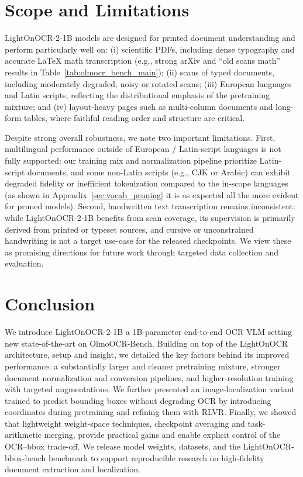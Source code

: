 \documentclass{article}
\begin{document}
\section{Scope and Limitations}
\label{sec:scope_limitations}

LightOnOCR-2-1B models are designed for printed document understanding and perform particularly well on:
(i) scientific PDFs, including dense typography and accurate \LaTeX{} math transcription (e.g., strong arXiv and ``old scans math'' results in Table~\ref{tab:olmocr_bench_main});
(ii) scans of typed documents, including moderately degraded, noisy or rotated scans;
(iii) European languages and Latin scripts, reflecting the distributional emphasis of the pretraining mixture;
and (iv) layout-heavy pages such as multi-column documents and long-form tables, where faithful reading order and structure are critical.

Despite strong overall robustness, we note two important limitations.
First, multilingual performance outside of European / Latin-script languages is not fully supported: our training mix and normalization pipeline prioritize Latin-script documents, and some non-Latin scripts (e.g., CJK or Arabic) can exhibit degraded fidelity or inefficient tokenization compared to the in-scope languages (as shown in Appendix~\ref{sec:vocab_pruning} it is as expected all the more evident for pruned models).
Second, handwritten text transcription remains inconsistent: while LightOnOCR-2-1B benefits from scan coverage, its supervision is primarily derived from printed or typeset sources, and cursive or unconstrained handwriting is not a target use-case for the released checkpoints.
We view these as promising directions for future work through targeted data collection and evaluation.


\section{Conclusion}
We introduce LightOnOCR-2-1B a 1B-parameter end-to-end OCR VLM setting new state-of-the-art on OlmoOCR-Bench. Building on top of the LightOnOCR architecture, setup and insight, we detailed the key factors behind its improved performance: a substantially larger and cleaner pretraining mixture, stronger document normalization and conversion pipelines, and higher-resolution training with targeted augmentations. We further presented an image-localization variant trained to predict bounding boxes without degrading OCR by introducing coordinates during pretraining and refining them with RLVR. Finally, we showed that lightweight weight-space techniques, checkpoint averaging and task-arithmetic merging, provide practical gains and enable explicit control of the OCR--bbox trade-off. We release model weights, datasets, and the LightOnOCR-bbox-bench benchmark to support reproducible research on high-fidelity document extraction and localization.
\end{document}
